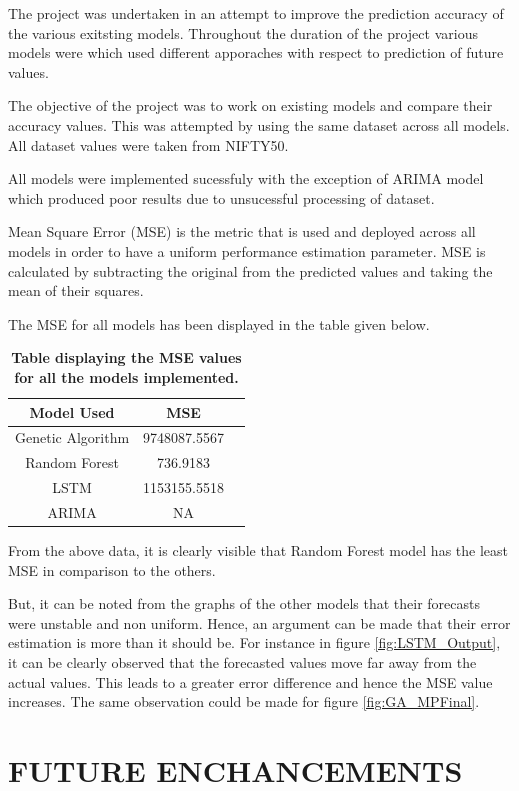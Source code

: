 \documentclass[BTech]{srmuthesis}
\begin{document}
The project was undertaken in an attempt to improve the prediction accuracy of the various exitsting models. Throughout the duration of the project various models were which used different apporaches with respect to prediction of future values.

The objective of the project was to work on existing models and compare their accuracy values. This was attempted by using the same dataset across all models.
All dataset values were taken from \ac{NIFTY50}. 

All models were implemented sucessfuly with the exception of ARIMA model which produced poor results due to unsucessful processing of dataset. 

Mean Square Error (MSE) is the metric that is used and deployed across all models in order to have a uniform performance estimation parameter. MSE is calculated by subtracting the original from the predicted values and taking the mean of their squares.

The MSE for all models has been displayed in the table given below.

\begin{table}[H]
	\centering
	\begin{tabular}{|c|c|c|}
		\hline
		\bf Model Used & \bf MSE \\
		\hline
		Genetic Algorithm & 9748087.5567\\	
		\hline
		Random Forest & 736.9183\\	
		\hline
		LSTM & 1153155.5518\\	
		\hline
		ARIMA & NA\\	
		\hline
	\end{tabular}
	\caption{\bf Table displaying the MSE values for all the models implemented.}
\end{table}

From the above data, it is clearly visible that Random Forest model has the least MSE in comparison to the others.

But, it can be noted from the graphs of the other models that their forecasts were unstable and non uniform. Hence, an argument can be made that their error estimation is more than it should be. For instance in figure \ref{fig:LSTM_Output}, it can be clearly observed that the forecasted values move far away from the actual values. This leads to a greater error difference and hence the MSE value increases. The same observation could be made for figure \ref{fig:GA_MPFinal}.


\chapter{FUTURE ENCHANCEMENTS}
\end{document}
